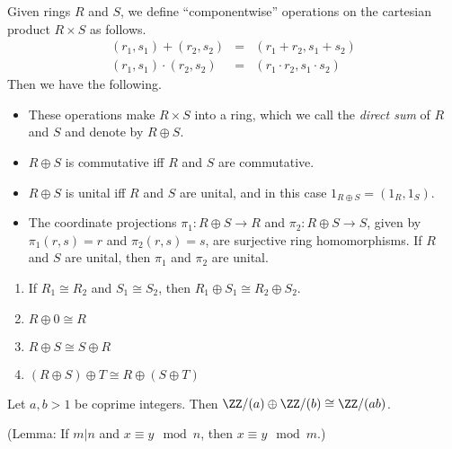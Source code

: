 \documentclass{article}
\begin{document}

\begin{thm}
Given rings $R$ and $S$, we define ``componentwise'' operations on the cartesian product $R \times S$ as follows.
\begin{eqnarray*}
(r_1, s_1) + (r_2, s_2) & = & (r_1 + r_2, s_1 + s_2) \\
(r_1, s_1) \cdot (r_2, s_2) & = & (r_1 \cdot r_2, s_1 \cdot s_2)
\end{eqnarray*}
Then we have the following.
\begin{itemize}
\item These operations make $R \times S$ into a ring, which we call the \emph{direct sum} of $R$ and $S$ and denote by $R \oplus S$.
\item $R \oplus S$ is commutative iff $R$ and $S$ are commutative.
\item $R \oplus S$ is unital iff $R$ and $S$ are unital, and in this case $1_{R \oplus S} = (1_R, 1_S)$.
\item The coordinate projections $\pi_1 : R \oplus S \rightarrow R$ and $\pi_2 : R \oplus S \rightarrow S$, given by $\pi_1(r,s) = r$ and $\pi_2(r,s) = s$, are surjective ring homomorphisms. If $R$ and $S$ are unital, then $\pi_1$ and $\pi_2$ are unital.
\end{itemize}
\end{thm}

\begin{prop} \mbox{}
\begin{enumerate}
\item If $R_1 \cong R_2$ and $S_1 \cong S_2$, then $R_1 \oplus S_1 \cong R_2 \oplus S_2$.
\item $R \oplus 0 \cong R$
\item $R \oplus S \cong S \oplus R$
\item $(R \oplus S) \oplus T \cong R \oplus (S \oplus T)$
\end{enumerate}
\end{prop}

\begin{prop}
Let $a, b > 1$ be coprime integers. Then $\ZZ/(a) \oplus \ZZ/(b) \cong \ZZ/(ab)$.
\end{prop}

(Lemma: If $m|n$ and $x \equiv y \mod n$, then $x \equiv y \mod m$.)
\end{document}

